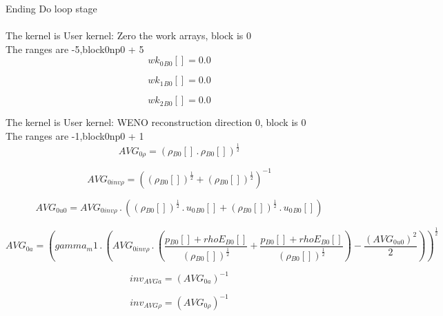 \documentclass{article}
\begin{document}
\noindent Ending Do loop stage\\
\\\noindent The kernel is User kernel: Zero the work arrays, block is 0\\\noindent The ranges are -5,block0np0 + 5\\\begin{dmath}{wk_{0}{_{B0}}}[{}] = 0.0\end{dmath}

\begin{dmath}{wk_{1}{_{B0}}}[{}] = 0.0\end{dmath}

\begin{dmath}{wk_{2}{_{B0}}}[{}] = 0.0\end{dmath}

\noindent The kernel is User kernel: WENO reconstruction direction 0, block is 0\\\noindent The ranges are -1,block0np0 + 1\\\begin{dmath}AVG_{0 \rho} = \left({\rho{_{B0}}}[{}] \,.\, {\rho{_{B0}}}[{}] \right)^{\frac{1}{2}}\end{dmath}

\begin{dmath}AVG_{0 inv \rho} = \left(\left({\rho{_{B0}}}[{}] \right)^{\frac{1}{2}} + \left({\rho{_{B0}}}[{}] \right)^{\frac{1}{2}} \right)^{-1}\end{dmath}

\begin{dmath}AVG_{0 u0} = AVG_{0 inv \rho} \,.\, \left(\left({\rho{_{B0}}}[{}] \right)^{\frac{1}{2}} \,.\, {u_{0}{_{B0}}}[{}] + \left({\rho{_{B0}}}[{}] \right)^{\frac{1}{2}} \,.\, {u_{0}{_{B0}}}[{}]\right)\end{dmath}

\begin{dmath}AVG_{0 a} = \left(gamma_m1 \,.\, \left(AVG_{0 inv \rho} \,.\, \left(\frac{{p{_{B0}}}[{}] + {rhoE{_{B0}}}[{}]}{\left({\rho{_{B0}}}[{}] \right)^{\frac{1}{2}}} + \frac{{p{_{B0}}}[{}] + {rhoE{_{B0}}}[{}]}{\left({\rho{_{B0}}}[{}] 
\right)^{\frac{1}{2}}}\right) - \frac{\left(AVG_{0 u0} \right)^{2}}{2}\right) \right)^{\frac{1}{2}}\end{dmath}

\begin{dmath}inv_{AVG a} = \left(AVG_{0 a} \right)^{-1}\end{dmath}

\begin{dmath}inv_{AVG \rho} = \left(AVG_{0 \rho} \right)^{-1}\end{dmath}
\end{document}

